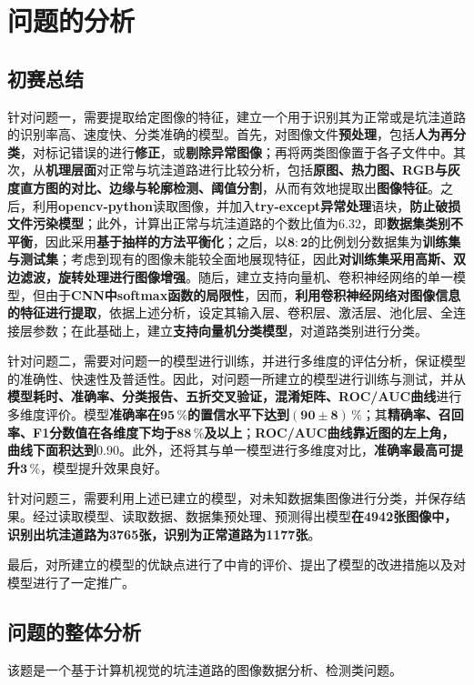\documentclass{MathorCupmodeling}
\begin{document}
	\section{问题的分析}
	\subsection{初赛总结}
		{\heiti 针对问题一}，需要提取给定图像的特征，建立一个用于识别其为正常或是坑洼道路的识别率高、速度快、分类准确的模型。首先，对图像文件\textbf{预处理}，包括\textbf{人为再分类}，对标记错误的进行\textbf{修正}，或\textbf{剔除异常图像}；再将两类图像置于各子文件中。其次，从\textbf{机理层面}对正常与坑洼道路进行比较分析，包括\textbf{原图、热力图、RGB与灰度直方图的对比、边缘与轮廓检测、阈值分割}，从而有效地提取出\textbf{图像特征}。之后，利用\textbf{opencv-python}读取图像，并加入\textbf{try-except异常处理}语块，\textbf{防止破损文件污染模型}；此外，计算出正常与坑洼道路的个数比值为$\boldsymbol{6.32}$，即\textbf{数据集类别不平衡}，因此采用\textbf{基于抽样的方法平衡化}；之后，以$\boldsymbol{8:2}$的比例划分数据集为\textbf{训练集与测试集}；考虑到现有的图像未能较全面地展现特征，因此\textbf{对训练集采用高斯、双边滤波，旋转处理进行图像增强}。随后，建立支持向量机、卷积神经网络的单一模型，但由于\textbf{CNN中softmax函数的局限性}，因而，\textbf{利用卷积神经网络对图像信息的特征进行提取}，依据上述分析，设定其输入层、卷积层、激活层、池化层、全连接层参数；在此基础上，建立\textbf{支持向量机分类模型}，对道路类别进行分类。

		{\heiti 针对问题二}，需要对问题一的模型进行训练，并进行多维度的评估分析，保证模型的准确性、快速性及普适性。因此，对问题一所建立的模型进行训练与测试，并从\textbf{模型耗时、准确率、分类报告、五折交叉验证，混淆矩阵、ROC/AUC曲线}进行多维度评价。模型\textbf{准确率在$\boldsymbol{95\,\%}$的置信水平下达到$\boldsymbol{\left(90\pm 8\right)\,\%}$}；其\textbf{精确率、召回率、F1分数值在各维度下均于$\boldsymbol{88\,\%}$及以上}；\textbf{ROC/AUC曲线靠近图的左上角，曲线下面积达到$\boldsymbol{0.90}$}。此外，还将其与单一模型进行多维度对比，\textbf{准确率最高可提升$\boldsymbol{3\,\%}$}，模型提升效果良好。

		{\heiti 针对问题三}，需要利用上述已建立的模型，对未知数据集图像进行分类，并保存结果。经过读取模型、读取数据、数据集预处理、预测得出模型\textbf{在4942张图像中，识别出坑洼道路为3765张，识别为正常道路为1177张}。
		
		{\heiti 最后}，对所建立的模型的优缺点进行了中肯的评价、提出了模型的改进措施以及对模型进行了一定推广。
	\subsection{问题的整体分析}
	该题是一个基于计算机视觉的坑洼道路的图像数据分析、检测类问题。
\end{document}
